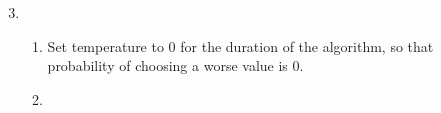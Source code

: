 \documentclass{article}
\begin{document}
\begin{enumerate}
    \setcounter{enumi}{2}
    \item
    \begin{enumerate}
        \item Set temperature to 0 for the duration of the algorithm, so that probability of choosing a worse value is 0.

        \item 
    \end{enumerate}
\end{enumerate}
\end{document}
